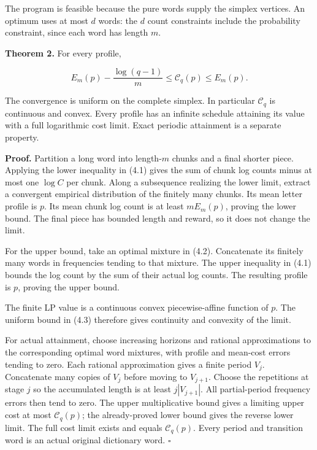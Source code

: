 \documentclass[11pt,a4paper]{article}
\begin{document}
The program is feasible because the pure words supply the simplex vertices. An optimum uses at most \(d\) words: the \(d\) count constraints include the probability constraint, since each word has length \(m\).

\textbf{Theorem 2.} For every profile,

\[
\boxed{
E_m(p)-\frac{\log(q-1)}m
\le\mathcal C_q(p)\le E_m(p).
}
\tag{4.3}
\]

The convergence is uniform on the complete simplex. In particular \(\mathcal C_q\) is continuous and convex. Every profile has an infinite schedule attaining its value with a full logarithmic cost limit. Exact periodic attainment is a separate property.

\textbf{Proof.} Partition a long word into length-\(m\) chunks and a final shorter piece. Applying the lower inequality in (4.1) gives the sum of chunk log counts minus at most one \(\log C\) per chunk. Along a subsequence realizing the lower limit, extract a convergent empirical distribution of the finitely many chunks. Its mean letter profile is \(p\). Its mean chunk log count is at least \(mE_m(p)\), proving the lower bound. The final piece has bounded length and reward, so it does not change the limit.

For the upper bound, take an optimal mixture in (4.2). Concatenate its finitely many words in frequencies tending to that mixture. The upper inequality in (4.1) bounds the log count by the sum of their actual log counts. The resulting profile is \(p\), proving the upper bound.

The finite LP value is a continuous convex piecewise-affine function of \(p\). The uniform bound in (4.3) therefore gives continuity and convexity of the limit.

For actual attainment, choose increasing horizons and rational approximations to the corresponding optimal word mixtures, with profile and mean-cost errors tending to zero. Each rational approximation gives a finite period \(V_j\). Concatenate many copies of \(V_j\) before moving to \(V_{j+1}\). Choose the repetitions at stage \(j\) so the accumulated length is at least \(j|V_{j+1}|\). All partial-period frequency errors then tend to zero. The upper multiplicative bound gives a limiting upper cost at most \(\mathcal C_q(p)\); the already-proved lower bound gives the reverse lower limit. The full cost limit exists and equals \(\mathcal C_q(p)\). Every period and transition word is an actual original dictionary word. \(\square\)
\end{document}
